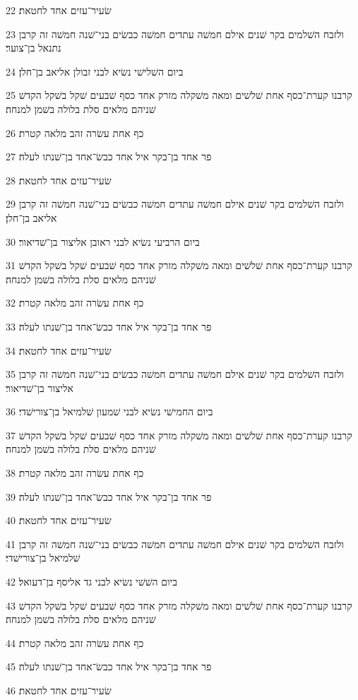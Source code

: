 \par 22 שׂעיר־עזים אחד לחטאת׃
\par 23 ולזבח השׁלמים בקר שׁנים אילם חמשׁה עתדים חמשׁה כבשׂים בני־שׁנה חמשׁה זה קרבן נתנאל בן־צוער׃
\par 24 ביום השׁלישׁי נשׂיא לבני זבולן אליאב בן־חלן׃
\par 25 קרבנו קערת־כסף אחת שׁלשׁים ומאה משׁקלה מזרק אחד כסף שׁבעים שׁקל בשׁקל הקדשׁ שׁניהם מלאים סלת בלולה בשׁמן למנחה׃
\par 26 כף אחת עשׂרה זהב מלאה קטרת׃
\par 27 פר אחד בן־בקר איל אחד כבשׂ־אחד בן־שׁנתו לעלה׃
\par 28 שׂעיר־עזים אחד לחטאת׃
\par 29 ולזבח השׁלמים בקר שׁנים אילם חמשׁה עתדים חמשׁה כבשׂים בני־שׁנה חמשׁה זה קרבן אליאב בן־חלן׃
\par 30 ביום הרביעי נשׂיא לבני ראובן אליצור בן־שׁדיאור׃
\par 31 קרבנו קערת־כסף אחת שׁלשׁים ומאה משׁקלה מזרק אחד כסף שׁבעים שׁקל בשׁקל הקדשׁ שׁניהם מלאים סלת בלולה בשׁמן למנחה׃
\par 32 כף אחת עשׂרה זהב מלאה קטרת׃
\par 33 פר אחד בן־בקר איל אחד כבשׂ־אחד בן־שׁנתו לעלה׃
\par 34 שׂעיר־עזים אחד לחטאת׃
\par 35 ולזבח השׁלמים בקר שׁנים אילם חמשׁה עתדים חמשׁה כבשׂים בני־שׁנה חמשׁה זה קרבן אליצור בן־שׁדיאור׃
\par 36 ביום החמישׁי נשׂיא לבני שׁמעון שׁלמיאל בן־צורישׁדי׃
\par 37 קרבנו קערת־כסף אחת שׁלשׁים ומאה משׁקלה מזרק אחד כסף שׁבעים שׁקל בשׁקל הקדשׁ שׁניהם מלאים סלת בלולה בשׁמן למנחה׃
\par 38 כף אחת עשׂרה זהב מלאה קטרת׃
\par 39 פר אחד בן־בקר איל אחד כבשׂ־אחד בן־שׁנתו לעלה׃
\par 40 שׂעיר־עזים אחד לחטאת׃
\par 41 ולזבח השׁלמים בקר שׁנים אילם חמשׁה עתדים חמשׁה כבשׂים בני־שׁנה חמשׁה זה קרבן שׁלמיאל בן־צורישׁדי׃
\par 42 ביום השׁשׁי נשׂיא לבני גד אליסף בן־דעואל׃
\par 43 קרבנו קערת־כסף אחת שׁלשׁים ומאה משׁקלה מזרק אחד כסף שׁבעים שׁקל בשׁקל הקדשׁ שׁניהם מלאים סלת בלולה בשׁמן למנחה׃
\par 44 כף אחת עשׂרה זהב מלאה קטרת׃
\par 45 פר אחד בן־בקר איל אחד כבשׂ־אחד בן־שׁנתו לעלה׃
\par 46 שׂעיר־עזים אחד לחטאת׃
